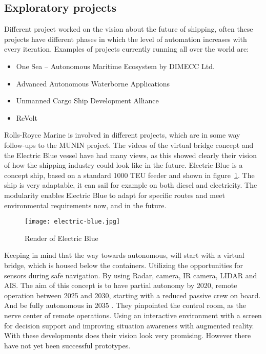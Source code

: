 \subsection{Exploratory projects}
Different project worked on the vision about the future of shipping, often these projects have different phases in which the level of automation increases with every iteration. Examples of projects currently running all over the world are:
\begin{itemize}
	\item One Sea – Autonomous Maritime Ecosystem by DIMECC Ltd.
	\item Advanced Autonomous Waterborne Applications
	\item Unmanned Cargo Ship Development Alliance 
	\item ReVolt
\end{itemize}

Rolls-Royce Marine is involved in different projects, which are in some way follow-ups to the MUNIN project. The videos of the virtual bridge concept and the Electric Blue vessel have had many views, as this showed clearly their vision of how the shipping industry could look like in the future. Electric Blue is a concept ship, based on a standard 1000 TEU feeder and shown in figure~\ref{fig:electric-blue}. The ship is very adaptable, it can sail for example on both diesel and electricity. The modularity enables Electric Blue to adapt for specific routes and meet environmental requirements now, and in the future. 

\begin{figure}[p]
	\centering
	\texttt{[image: electric-blue.jpg]}
	\caption{Render of Electric Blue}
	\label{fig:electric-blue}
\end{figure}

Keeping in mind that the way towards autonomous, will start with a virtual bridge, which is housed below the containers. Utilizing the opportunities for sensors during safe navigation. By using Radar, camera, IR camera, LIDAR and \ac{AIS}. The aim of this concept is to have partial autonomy by 2020, remote operation between 2025 and 2030, starting with a reduced passive crew on board. And be fully autonomous in 2035 \cite{Wilson2017}. 
They pinpointed the control room, as the nerve center of remote operations. Using an interactive environment with a screen for decision support and improving situation awareness with augmented reality. With these developments does their vision look very promising. However there have not yet been successful prototypes.

